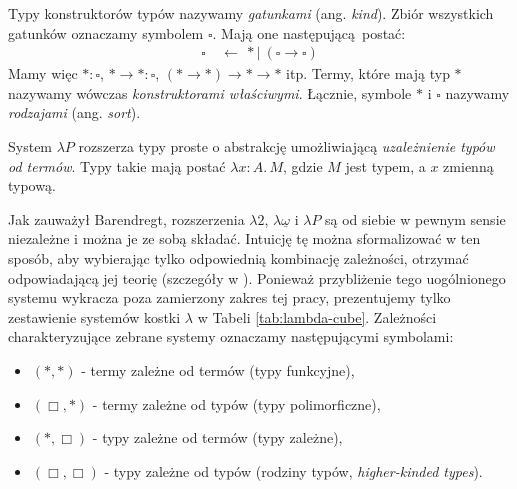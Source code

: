 Typy konstruktorów typów nazywamy \emph{gatunkami} (ang. \emph{kind}). Zbiór wszystkich gatunków oznaczamy symbolem \(\square\). Mają one następującą postać:
  \begin{align*}
    \square\ &\leftarrow\ \ast |\ (\square\to\square)
  \end{align*}
Mamy   więc    \(\ast:\square\),   \(\ast\to\ast    :   \square\),
\((\ast\to\ast)\to\ast\to\ast\)  itp.   Termy,  które   mają  typ
\(\ast\)  nazywamy   wówczas  \emph{konstruktorami  właściwymi}.
Łącznie, symbole \(\ast\)  i \(\square\) nazywamy \emph{rodzajami}
(ang. \emph{sort}).

System \(\lambda P\) rozszerza typy proste o abstrakcję umożliwiającą \emph{uzależnienie typów od termów}. Typy takie mają postać \(\lambda x:A.\,M\), gdzie \(M\) jest typem, a \(x\) zmienną typową. 

Jak zauważył Barendregt, rozszerzenia \(\lambda 2\), \(\lambda{\underline{\omega}}\) i \(\lambda P\) są od siebie w pewnym sensie niezależne i można je ze sobą składać. Intuicję tę można sformalizować  w ten sposób, aby wybierając tylko odpowiednią kombinację zależności, otrzymać odpowiadającą jej teorię (szczegóły w \cite{barendregt_1991}). Ponieważ przybliżenie tego uogólnionego systemu wykracza poza zamierzony zakres tej pracy, prezentujemy tylko zestawienie systemów kostki \(\lambda\) w Tabeli \ref{tab:lambda-cube}. Zależności charakteryzujące zebrane systemy oznaczamy następującymi symbolami:
\begin{itemize}
  \setlength\itemsep{0em}
  \item \((*,*)\) - termy zależne od termów (typy funkcyjne),
  \item \((\Box,*)\) - termy zależne od typów (typy polimorficzne),
  \item \((*,\Box)\) - typy zależne od termów (typy zależne),
  \item \((\Box, \Box)\) - typy zależne od typów (rodziny typów, \emph{higher-kinded types}).
\end{itemize}

